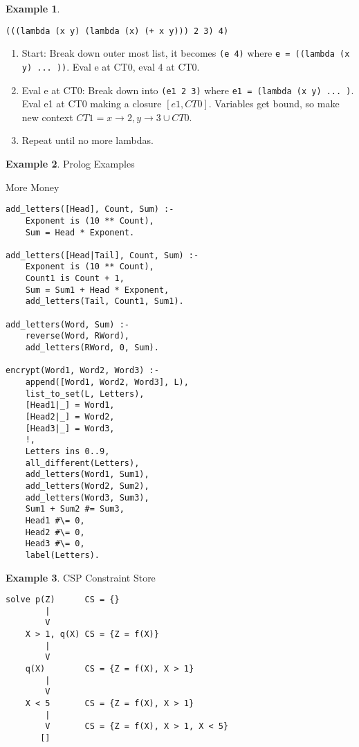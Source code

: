 \documentclass[landscape, letterpaper]{extarticle}
\theoremstyle{definition}
\newtheorem{example}{Example}
\begin{document}
\begin{multicols}{3}
\begin{example}
        \begin{verbatim}
(((lambda (x y) (lambda (x) (+ x y))) 2 3) 4)
\end{verbatim}
        \begin{enumerate}
            \item Start: Break down outer most list, it becomes \verb|(e 4)| where \verb|e = ((lambda (x y) ... ))|. Eval e at CT0, eval 4 at CT0.
            \item Eval e at CT0: Break down into \verb|(e1 2 3)| where \verb|e1 = (lambda (x y) ... )|. Eval e1 at CT0 making a closure \([e1, CT0]\). Variables get bound, so make new context \(CT1 = {x \rightarrow 2, y \rightarrow 3} \cup CT0\).
            \item Repeat until no more lambdas.
        \end{enumerate}
    \end{example}

\begin{example}
Prolog Examples

More Money
\begin{verbatim}
add_letters([Head], Count, Sum) :-
    Exponent is (10 ** Count),
    Sum = Head * Exponent.

add_letters([Head|Tail], Count, Sum) :-
    Exponent is (10 ** Count),
    Count1 is Count + 1,
    Sum = Sum1 + Head * Exponent,
    add_letters(Tail, Count1, Sum1).

add_letters(Word, Sum) :-
    reverse(Word, RWord),
    add_letters(RWord, 0, Sum).

encrypt(Word1, Word2, Word3) :-
    append([Word1, Word2, Word3], L),
    list_to_set(L, Letters),
    [Head1|_] = Word1,
    [Head2|_] = Word2,
    [Head3|_] = Word3,
    !,
    Letters ins 0..9,
    all_different(Letters),
    add_letters(Word1, Sum1),
    add_letters(Word2, Sum2),
    add_letters(Word3, Sum3),
    Sum1 + Sum2 #= Sum3,
    Head1 #\= 0,
    Head2 #\= 0,
    Head3 #\= 0,
    label(Letters).
\end{verbatim}
\end{example}

    \begin{example}
        CSP Constraint Store
\begin{verbatim}
solve p(Z)      CS = {}
        |
        V
    X > 1, q(X) CS = {Z = f(X)}
        |
        V
    q(X)        CS = {Z = f(X), X > 1}
        |
        V
    X < 5       CS = {Z = f(X), X > 1}
        |
        V       CS = {Z = f(X), X > 1, X < 5}
       []
\end{verbatim}


\end{example}
\end{multicols}
\end{document}
